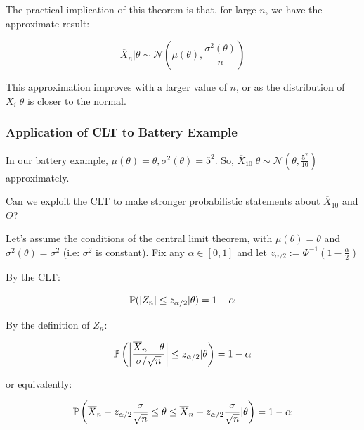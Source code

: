\documentclass[a4paper]{article}
\begin{document}
                The practical implication of this theorem is that, for large
                $n$, we have the approximate result:

                \[
                    \overline X_n | \theta \sim \mathcal{N}\left(\mu(\theta),
                    \frac{\sigma^2(\theta)}{n}\right)
                \]

                This approximation improves with a larger value of $n$, or as
                the distribution of $X_i | \theta$ is closer to the normal.

            \subsubsection{Application of CLT to Battery Example}
                In our battery example, $\mu(\theta) = \theta, \sigma^2(\theta)
                = 5^2$. So, $\overline X_{10} | \theta \sim
                \mathcal{N}\left(\theta, \frac{5^2}{10}\right)$ approximately.

                Can we exploit the CLT to make stronger probabilistic statements
                about $\overline X_{10}$ and $\Theta$?

                Let's assume the conditions of the central limit theorem, with
                $\mu(\theta) = \theta$ and $\sigma^2(\theta) = \sigma^2$ (i.e:
                $\sigma^2$ is constant). Fix any $\alpha \in [0, 1]$ and let
                $z_{\alpha/2} := \Phi^{-1}\left(1 - \frac{\alpha}{2}\right)$


                By the CLT:

                \[
                    \mathbb{P}(|Z_n| \leq z_{\alpha/2} | \theta) = 1 - \alpha
                \]

                By the definition of $Z_n$:

                \[
                    \mathbb{P}\left(\left|\frac{\overline X_n - \theta}
                    {\sigma/\sqrt{n}}\right| \leq z_{\alpha/2} | \theta\right) =
                    1 - \alpha
                \]

                or equivalently:

                \[
                    \mathbb{P}\left(\overline X_n - z_{\alpha/2} \frac{\sigma}
                    {\sqrt{n}} \leq \theta \leq \overline X_n + z_{\alpha/2}
                    \frac{\sigma}{\sqrt{n}}|\theta\right) = 1 - \alpha
                \]
\end{document}
